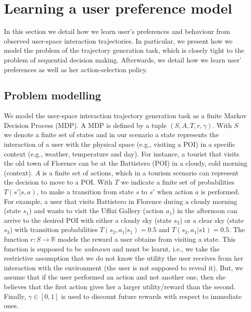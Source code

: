 \section{Learning a user preference model}
\label{sec:learning_user_preferences}
In this section we detail how we learn user's preferences and behaviour from observed user-space interaction trajectories.
In particular, we present how we model the problem of the trajectory generation task, which is closely tight to the problem of sequential decision making. Afterwards, we detail how we  learn user' preferences as well as her action-selection policy. 

\subsection{Problem modelling}
We model the user-space interaction trajectory generation task
as a finite Markov Decision Process (MDP). A MDP is defined by a tuple $(S,A,T,r,\gamma)$. With $S$ we denote a finite set of states and in our scenario a state represents the interaction of a user with the physical space (e.g., visiting a POI) in a specific context (e.g., weather, temperature and day). For instance, a tourist that visits the old town of Florence can be at the Battistero (POI) in a cloudy, cold morning (context). $A$ is a finite set of actions, which in a tourism scenario can represent the decision to move to a POI. With $T$ we indicate a finite set of probabilities $T(s'| s, a)$, to make a transition from state $s$ to $s'$ when action $a$ is performed. For example, a user that visits Battistero in Florence during a cloudy morning (state $s_1$) and wants to visit the Uffizi Gallery (action $a_{1}$) in the afternoon can arrive to the desired POI with either a cloudy sky (state $s_2$) or a clear sky (state $s_3$) with transition probabilities $T(s_2,a_{1}|s_1)=0.5$ and $T(s_3,a_{1}|s1)=0.5$.
The function $r: S \rightarrow \mathbb{R}$ models the reward a user obtains from visiting a state. This function is supposed to be {\it unknown} and must be learnt, i.e., we take the restrictive assumption that we do not know the utility the user receives from her interaction with the environment (the user is not supposed to reveal it). But, we assume that if the user performed an action and not another one, then she believes that the first action gives her a larger utility/reward than the second. Finally, $\gamma \in [0,1]$ is used to discount future rewards with respect to immediate ones. 
